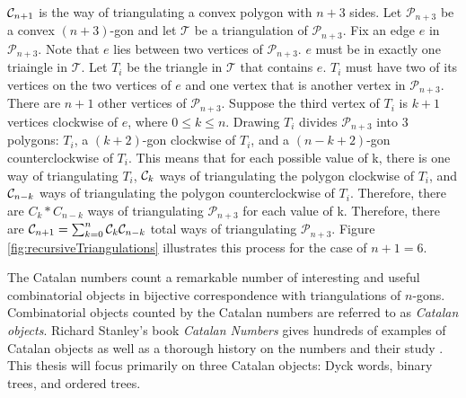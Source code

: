 $\mathcal{C}_{n+1}$ is the way of triangulating a convex polygon with $n+3$ sides.  Let $\mathcal{P}_{n+3}$ be a convex $(n+3)$-gon and let $\mathcal{T}$ be a triangulation of $\mathcal{P}_{n+3}$. Fix an edge $e$ in $\mathcal{P}_{n+3}$.  Note that $e$ lies between two vertices of $\mathcal{P}_{n+3}$. $e$ must be in exactly one triaingle in $\mathcal{T}$.  Let $T_{i}$ be the triangle in $\mathcal{T}$ that contains $e$.  $T_{i}$ must have two of its vertices on the two vertices of $e$ and one vertex that is another vertex in $\mathcal{P}_{n+3}$.  There are $n+1$ other vertices of $\mathcal{P}_{n+3}$.  Suppose the third vertex of $T_i$ is $k+1$ vertices clockwise of $e$, where $0\le k \le n$. Drawing $T_i$ divides $\mathcal{P}_{n+3}$ into 3 polygons: $T_i$, a $(k+2)$-gon clockwise of $T_i$, and a $(n-k+2)$-gon counterclockwise of $T_i$. This means that for each possible value of k, there is one way of triangulating $T_i$, $\mathcal{C}_k$ ways of triangulating the polygon clockwise of $T_i$, and $\mathcal{C}_{n-k}$ ways of triangulating the polygon counterclockwise of $T_i$.  Therefore, there are $C_k*C_{n-k}$ ways of triangulating $\mathcal{P}_{n+3}$ for each value of k.  Therefore, there are $\mathcal{C}_{n+1}=\sum_{k=0}^{n}{\mathcal{C}_{k}\mathcal{C}_{n-k}}$ total ways of triangulating $\mathcal{P}_{n+3}$. Figure \ref{fig:recursiveTriangulations} illustrates this process for the case of $n+1=6$.


The Catalan numbers count a remarkable number of interesting and useful combinatorial objects in bijective correspondence with triangulations of $n$-gons. Combinatorial objects counted by the Catalan numbers are referred to as \emph{Catalan objects}.   Richard Stanley's book \emph{Catalan Numbers} gives hundreds of examples of Catalan objects  as well as a thorough history on the numbers and their study \cite{stanley2015Catalan}. This thesis will focus primarily on three Catalan objects: Dyck words, binary trees, and ordered trees. 


